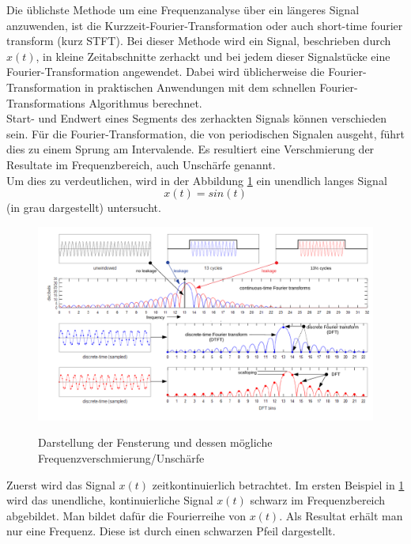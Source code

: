 
Die üblichste Methode um eine Frequenzanalyse über ein längeres Signal anzuwenden, ist die  Kurzzeit-Fourier-Transformation oder auch short-time fourier transform (kurz STFT). Bei dieser Methode wird ein Signal, beschrieben durch $x(t)$, in kleine Zeitabschnitte zerhackt und bei jedem dieser Signalstücke eine Fourier-Transformation angewendet. Dabei wird üblicherweise die Fourier-Transformation in praktischen Anwendungen mit dem schnellen Fourier-Transformations Algorithmus berechnet.\\

Start- und Endwert eines Segments des zerhackten Signals können verschieden sein. Für die Fourier-Transformation, die von periodischen Signalen ausgeht, führt dies zu einem Sprung am Intervalende. Es resultiert eine Verschmierung der Resultate im Frequenzbereich, auch Unschärfe genannt. \\

Um dies zu verdeutlichen, wird in der Abbildung \ref{fig:Spectral} ein unendlich langes Signal 
\[x(t)=sin(t)\]
(in grau dargestellt) untersucht. \\

\begin{figure}[!ht]
	\centering
	\includegraphics[scale=0.8]{papers/autotune/sections/fft/images/windows/Spectral.pdf}
	\caption{Darstellung der Fensterung und dessen mögliche Frequenzverschmierung/Unschärfe}\cite{wikipedia:Window}
	\label{fig:Spectral}
\end{figure}%

Zuerst wird das Signal $x(t)$ zeitkontinuierlich betrachtet. Im ersten Beispiel in \ref{fig:Spectral} wird das unendliche, kontinuierliche Signal $x(t)$ schwarz im Frequenzbereich abgebildet. Man bildet dafür die Fourierreihe von $x(t)$. Als Resultat erhält man nur eine Frequenz. Diese ist durch einen schwarzen Pfeil dargestellt.\\

